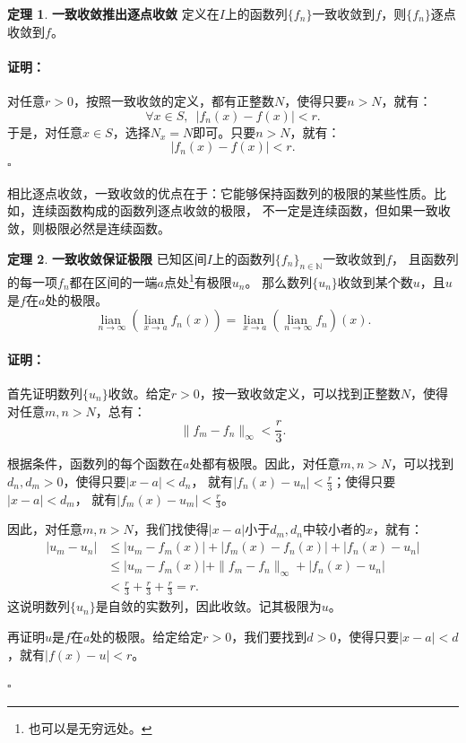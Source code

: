 \documentclass[12pt,UTF8]{ctexbook}
\newcommand{\lian}[1]{
    \underset{#1}{\operatorname{lian}\,}
}
\theoremstyle{definition}
\newtheorem{tm}{定理}[section]
\theoremstyle{plain}
\renewenvironment{proof}{\paragraph{\textbf{证明：}}}{\hfill$\square$}
\begin{document}
\begin{appendix}
\begin{tm}{\textbf{一致收敛推出逐点收敛}}
    定义在$I$上的函数列$\{f_n\}$一致收敛到$f$，则$\{f_n\}$逐点收敛到$f$。
\end{tm}

\begin{proof}
    对任意$r>0$，按照一致收敛的定义，都有正整数$N$，使得只要$n>N$，就有：
    $$ \forall x\in S, \,\,\,|f_n(x) - f(x) | < r.$$
    于是，对任意$x\in S$，选择$N_x = N$即可。只要$n>N$，就有：
    $$ |f_n(x) - f(x) | < r.$$
\end{proof}

相比逐点收敛，一致收敛的优点在于：它能够保持函数列的极限的某些性质。比如，连续函数构成的函数列逐点收敛的极限，
不一定是连续函数，但如果一致收敛，则极限必然是连续函数。

\begin{tm}{\textbf{一致收敛保证极限}}
    已知区间$I$上的函数列$\{f_n\}_{n\in\mathbb{N}}$一致收敛到$f$，
    且函数列的每一项$f_n$都在区间的一端$a$点处\footnote{也可以是无穷远处。}有极限$u_n$。
    那么数列$\{u_n\}$收敛到某个数$u$，且$u$是$f$在$a$处的极限。
    $$ \lian{n\to \infty} \left(\lian{x\to a} f_n(x) \right) = \lian{x\to a} \left(\lian{n\to \infty} f_n\right)(x). $$
\end{tm}

\begin{proof}
    首先证明数列$\{u_n\}$收敛。给定$r>0$，按一致收敛定义，可以找到正整数$N$，使得对任意$m,n>N$，总有：
    $$ \| f_m - f_n\|_{\infty} < \frac{r}{3}.$$

    根据条件，函数列的每个函数在$a$处都有极限。因此，对任意$m,n>N$，可以找到$d_n, d_m > 0$，使得只要$|x - a| < d_n$，
    就有$|f_n(x) - u_n| < \frac{r}{3}$；使得只要$|x - a| < d_m$，
    就有$|f_m(x) - u_m| < \frac{r}{3}$。

    因此，对任意$m,n>N$，我们找使得$|x - a|$小于$d_m, d_n$中较小者的$x$，就有：
    \begin{align*}
        |u_m - u_n| &\leqslant |u_m - f_m(x)| + |f_m(x) - f_n(x)| + |f_n(x) - u_n| \\
        &\leqslant |u_m - f_m(x)| + \| f_m - f_n\|_{\infty} + |f_n(x) - u_n| \\
        &< \frac{r}{3} + \frac{r}{3} + \frac{r}{3} = r.
    \end{align*}
    这说明数列$\{u_n\}$是自敛的实数列，因此收敛。记其极限为$u$。

    再证明$u$是$f$在$a$处的极限。给定给定$r>0$，我们要找到$d>0$，使得只要$|x - a| < d$，就有$|f(x) - u| < r$。
    

\end{proof}
\end{appendix}
\end{document}
